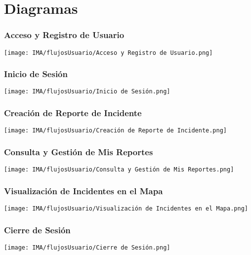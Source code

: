 \section{Diagramas}

\subsubsection*{Acceso y Registro de Usuario}
\begin{center}
    \texttt{[image: IMA/flujosUsuario/Acceso y Registro de Usuario.png]}
\end{center}

\newpage
\subsubsection*{Inicio de Sesión}
\begin{center}
    \texttt{[image: IMA/flujosUsuario/Inicio de Sesión.png]}
\end{center}

\newpage
\subsubsection*{Creación de Reporte de Incidente}
\begin{center}
    \texttt{[image: IMA/flujosUsuario/Creación de Reporte de Incidente.png]}
\end{center}

\newpage
\subsubsection*{Consulta y Gestión de Mis Reportes}
\begin{center}
    \texttt{[image: IMA/flujosUsuario/Consulta y Gestión de Mis Reportes.png]}
\end{center}

\newpage
\subsubsection*{Visualización de Incidentes en el Mapa}
\begin{center}
    \texttt{[image: IMA/flujosUsuario/Visualización de Incidentes en el Mapa.png]}
\end{center}

\newpage
\subsubsection*{Cierre de Sesión}
\begin{center}
    \texttt{[image: IMA/flujosUsuario/Cierre de Sesión.png]}
\end{center}

